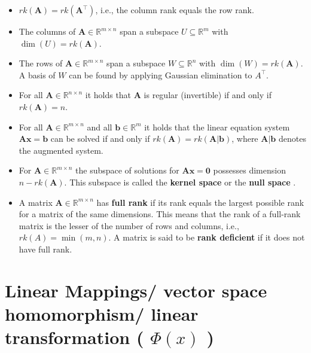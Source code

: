 \begin{itemize}
    \item $rk(\mathbf{A}) = rk(\mathbf{A}^\top)$, i.e., the column rank equals the row rank.

    \item The columns of $\mathbf{A} \in \mathbb{R}^{m \times n}$ span a subspace $U \subseteq \mathbb{R}^m$ with $\dim(U) = rk(\mathbf{A})$. 

    \item The rows of $\mathbf{A} \in \mathbb{R}^{m\times n}$ span a subspace $W \subseteq \mathbb{R}^n$ with $\dim(W) = rk(\mathbf{A})$. A basis of $W$ can be found by applying Gaussian elimination to $A^\top$.

    \item For all $\mathbf{A} \in \mathbb{R}^{n\times n}$ it holds that $\mathbf{A}$ is regular (invertible) if and only if $rk(\mathbf{A}) = n$.

    \item For all $\mathbf{A} \in \mathbb{R}^{m\times n}$ and all $\mathbf{b} \in \mathbb{R}^m$ it holds that the linear equation system $\mathbf{Ax = b}$ can be solved if and only if $rk(\mathbf{A}) = rk(\mathbf{A}|\mathbf{b})$, where $\mathbf{A}|\mathbf{b}$ denotes the augmented system.

    \item For $\mathbf{A} \in \mathbb{R}^{m\times n}$ the subspace of solutions for $\mathbf{Ax = 0}$ possesses dimension $n - rk(\mathbf{A})$. This subspace is called the \textbf{kernel space} or the \textbf{null space} \label{kernel space/ null space}.

    \item A matrix $\mathbf{A} \in \mathbb{R}^{m\times n}$ has \textbf{full rank}\label{matrix: full rank} if its rank equals the largest possible rank for a matrix of the same dimensions. This means that the rank of a full-rank matrix is the lesser of the number of rows and columns, i.e., $rk(A) = \min(m, n)$. A matrix is said to be \textbf{rank deficient}\label{matrix: rank deficient} if it does not have full rank.

\end{itemize}


\section{Linear Mappings/ vector space homomorphism/ linear transformation ( $\Phi(x)$ ) \cite{mfml-1}}\label{Linear Mappings/ vector space homomorphism/ linear transformation}


